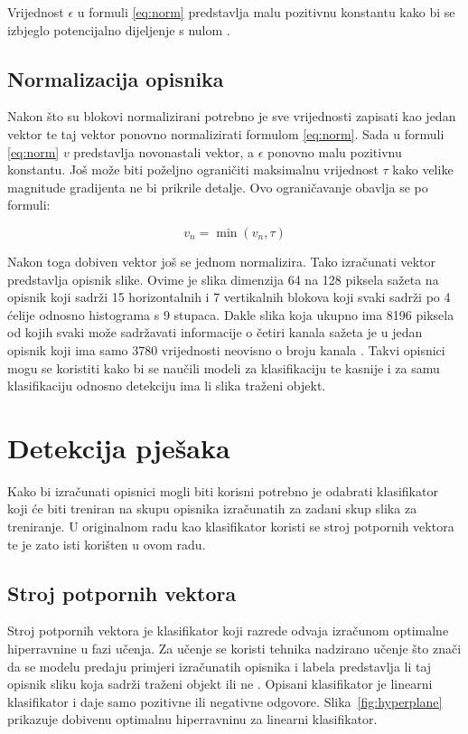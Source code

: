 \documentclass[times, utf8, zavrsni]{fer}
\begin{document}
Vrijednost $\epsilon$ u formuli \ref{eq:norm} predstavlja malu pozitivnu konstantu kako bi se izbjeglo potencijalno dijeljenje s nulom \citep{tomasi2012histograms}.

\section{Normalizacija opisnika}
Nakon što su blokovi normalizirani potrebno je sve vrijednosti zapisati kao jedan vektor te taj vektor ponovno normalizirati formulom \ref{eq:norm}. Sada u formuli \ref{eq:norm} \(v\) predstavlja novonastali vektor, a $\epsilon$ ponovno malu pozitivnu konstantu. Još može biti poželjno ograničiti maksimalnu vrijednost $\tau$ kako velike magnitude gradijenta ne bi prikrile detalje. Ovo ograničavanje obavlja se po formuli:

\begin{equation}
	v_n = \min(v_n, \tau)
	\label{eq:limit}
\end{equation}

Nakon toga dobiven vektor još se jednom normalizira. Tako izračunati vektor predstavlja opisnik slike. Ovime je slika dimenzija 64 na 128 piksela sažeta na opisnik koji sadrži 15 horizontalnih i 7 vertikalnih blokova koji svaki sadrži po 4 ćelije odnosno histograma s 9 stupaca. Dakle slika koja ukupno ima 8196 piksela od kojih svaki može sadržavati informacije o četiri kanala sažeta je u jedan opisnik koji ima samo 3780 vrijednosti neovisno o broju kanala \citep{tomasi2012histograms}. Takvi opisnici mogu se koristiti kako bi se naučili modeli za klasifikaciju te kasnije i za samu klasifikaciju odnosno detekciju ima li slika traženi objekt.

\chapter{Detekcija pješaka}
Kako bi izračunati opisnici mogli biti korisni potrebno je odabrati klasifikator koji će biti treniran na skupu opisnika izračunatih za zadani skup slika za treniranje. U originalnom radu \cite{dalal2005histograms} kao klasifikator koristi se stroj potpornih vektora te je zato isti korišten u ovom radu.

\section{Stroj potpornih vektora}
Stroj potpornih vektora  je klasifikator koji razrede odvaja izračunom optimalne hiperravnine u fazi učenja. Za učenje se koristi tehnika nadzirano učenje što znači da se modelu predaju primjeri izračunatih opisnika i labela predstavlja li taj opisnik sliku koja sadrži traženi objekt ili ne \citep{svm}. Opisani klasifikator je linearni klasifikator i daje samo pozitivne ili negativne odgovore. Slika~\ref{fig:hyperplane} prikazuje dobivenu optimalnu hiperravninu za linearni klasifikator.
\end{document}
